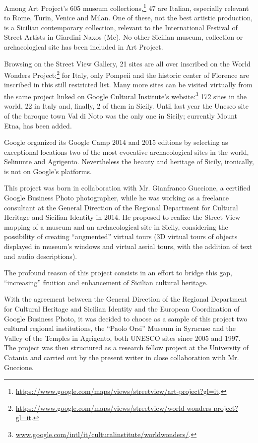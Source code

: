 \documentclass[amsthm,ebook]{saparticle}
\begin{document}
Among Art Project’s 605 museum collections,\footnote{\url{https://www.google.com/maps/views/streetview/art-project?gl=it}.} 47
are Italian, especially relevant to Rome, Turin, Venice and Milan. One of these, not the best artistic production, is a
Sicilian contemporary collection, relevant to the International Festival of Street Artists in Giardini Naxos (Me). No
other Sicilian museum, collection or archaeological site has been included in Art Project.

Browsing on the Street View Gallery, 21 sites are all over inscribed on the World Wonders
Project:\footnote{\url{https://www.google.com/maps/views/streetview/world-wonders-project?gl=it}.} for Italy, only Pompeii
and the historic center of Florence are inscribed in this still restricted list. Many more sites can be visited
virtually from the same project linked on Google Cultural Institute’s
website:\footnote{\url{www.google.com/intl/it/culturalinstitute/worldwonders/}. } 172 sites in the world, 22 in Italy and,
finally, 2 of them in Sicily. Until last year the Unesco site of the baroque town Val di Noto was the only one in
Sicily; currently Mount Etna, has been added. 

Google organized its Google Camp 2014 and 2015 editions by selecting as exceptional locations two of the most evocative
archaeological sites in the world, Selinunte and Agrigento. Nevertheless the beauty and heritage of Sicily, ironically,
is not on Google’s platforms.

This project was born in collaboration with Mr. Gianfranco Guccione, a certified Google Business Photo photographer,
while he was working as a freelance consultant at the General Direction of the Regional Department for Cultural
Heritage and Sicilian Identity in 2014. He proposed to realize the Street View mapping of a museum and an
archaeological site in Sicily, considering the possibility of creating ``augmented'' virtual tours (3D virtual tours of
objects displayed in museum’s windows and virtual aerial tours, with the addition of text and audio descriptions). 

The profound reason of this project consists in an effort to bridge this gap, ``increasing'' fruition and enhancement of
Sicilian cultural heritage. 

With the agreement between the General Direction of the Regional Department for Cultural Heritage and Sicilian Identity
and the European Coordination of Google Business Photo, it was decided to choose as a sample of this project two
cultural regional institutions, the ``Paolo Orsi'' Museum in Syracuse and the Valley of the Temples in Agrigento, both
UNESCO sites since 2005 and 1997. The project was then structured as a research fellow project at the University of
Catania and carried out by the present writer in close collaboration with Mr. Guccione. 
\end{document}
